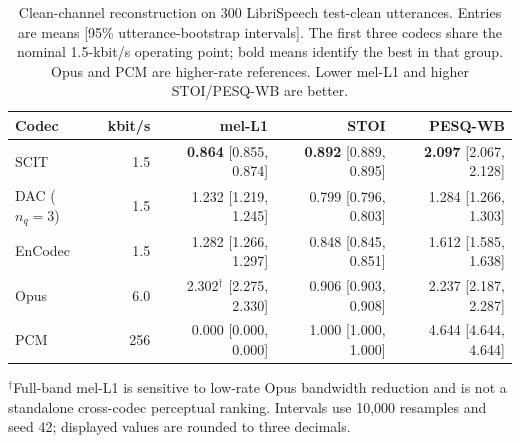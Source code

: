 \begin{table}[t]
\centering
\caption{Clean-channel reconstruction on 300 LibriSpeech test-clean utterances. Entries are means [95\% utterance-bootstrap intervals]. The first three codecs share the nominal 1.5-kbit/s operating point; bold means identify the best in that group. Opus and PCM are higher-rate references. Lower mel-L1 and higher STOI/PESQ-WB are better.}
\label{tab:rv3-quality}
\small\setlength{\tabcolsep}{5pt}
\begin{tabular}{lrrrr}
\toprule
Codec & kbit/s & mel-L1 & STOI & PESQ-WB\\
\midrule
SCIT & 1.5 & \textbf{0.864} [0.855, 0.874] & \textbf{0.892} [0.889, 0.895] & \textbf{2.097} [2.067, 2.128]\\
DAC ($n_q=3$) & 1.5 & 1.232 [1.219, 1.245] & 0.799 [0.796, 0.803] & 1.284 [1.266, 1.303]\\
EnCodec & 1.5 & 1.282 [1.266, 1.297] & 0.848 [0.845, 0.851] & 1.612 [1.585, 1.638]\\
Opus & 6.0 & 2.302$^\dagger$ [2.275, 2.330] & 0.906 [0.903, 0.908] & 2.237 [2.187, 2.287]\\
PCM & 256 & 0.000 [0.000, 0.000] & 1.000 [1.000, 1.000] & 4.644 [4.644, 4.644]\\
\bottomrule
\end{tabular}
\par\smallskip
\parbox{\textwidth}{\footnotesize $^\dagger$Full-band mel-L1 is sensitive to low-rate Opus bandwidth reduction and is not a standalone cross-codec perceptual ranking. Intervals use 10,000 resamples and seed 42; displayed values are rounded to three decimals.}
\end{table}
